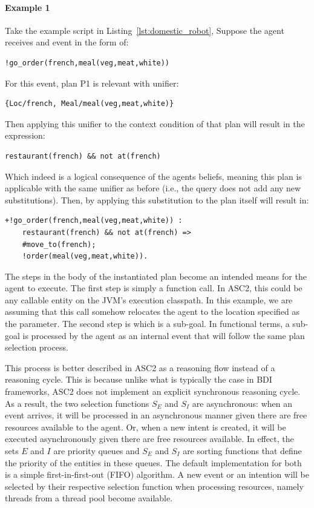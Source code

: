 \paragraph{Example 1}
Take the example script in Listing~\ref{lst:domestic_robot}, Suppose the agent receives and event in the form of: 
\begin{verbatim}
!go_order(french,meal(veg,meat,white))
\end{verbatim}
\noindent For this event, plan P1 is relevant with unifier:
\begin{verbatim}
{Loc/french, Meal/meal(veg,meat,white)}
\end{verbatim}
Then applying this unifier to the context condition of that plan will result in the expression:
\begin{verbatim}
restaurant(french) && not at(french)
\end{verbatim}
Which indeed is a logical consequence of the agents beliefs, meaning this plan is applicable with the same unifier as before (i.e., the query does not add any new substitutions). Then, by applying this substitution to the plan itself will result in:
\begin{verbatim}
+!go_order(french,meal(veg,meat,white)) :
    restaurant(french) && not at(french) =>
    #move_to(french);
    !order(meal(veg,meat,white)).
\end{verbatim}

The steps in the body of the instantiated plan become an intended means for the agent to execute. The first step  is simply a function call. In ASC2, this could be any callable entity on the JVM's execution classpath. In this example, we are assuming that this call somehow relocates the agent to the location specified as the parameter. The second step is  which is a sub-goal. In functional terms, a sub-goal is processed by the agent as an internal event that will follow the same plan selection process.

This process is better described in ASC2 as a reasoning flow instead of a reasoning cycle. This is because unlike what is typically the case in BDI frameworks, ASC2 does not implement an explicit synchronous reasoning cycle. As a result, the two selection functions $S_E$ and $S_I$ are asynchronous: when an event arrives, it will be processed in an asynchronous manner given there are free resources available to the agent. Or, when a new intent is created, it will be executed asynchronously given there are free resources available. In effect, the sets $E$ and $I$ are priority queues and $S_E$ and $S_I$ are sorting functions that define the priority of the entities in these queues. The default implementation for both is a simple first-in-first-out (FIFO) algorithm. A new event or an intention will be selected by their respective selection function when processing resources, namely threads from a thread pool become available.



